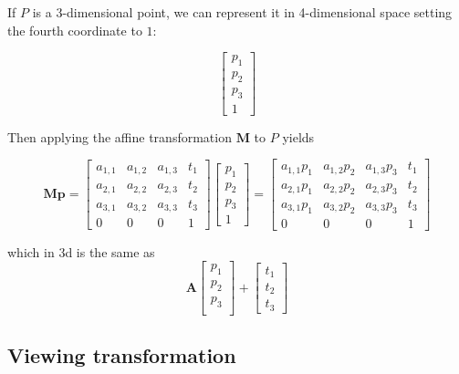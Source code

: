 \documentclass{scrartcl}
\begin{document}
    If $P$ is a 3-dimensional point, we can represent it in 4-dimensional space setting the fourth coordinate to $1$:
    
    \[
    \begin{bmatrix}
        p_1\\
        p_2\\
        p_3 \\
        1
    \end{bmatrix}
    \]
    
    Then applying the affine transformation $\mathbf{M}$ to $P$ yields
    
    \[
    \mathbf{M}\mathbf{p} =
    \begin{bmatrix}
        a_{1,1} & a_{1,2} & a_{1,3} & t_1 \\
        a_{2,1} & a_{2,2} & a_{2,3} & t_2 \\
        a_{3,1} & a_{3,2} & a_{3,3} & t_3 \\
        0 & 0 & 0 & 1 
    \end{bmatrix}
    \begin{bmatrix}
        p_1\\
        p_2\\
        p_3\\
        1
    \end{bmatrix} =
    \begin{bmatrix}
        a_{1,1}p_1 & a_{1,2}p_2 & a_{1,3}p_3 & t_1 \\
        a_{2,1}p_1 & a_{2,2}p_2 & a_{2,3}p_3 & t_2 \\
        a_{3,1}p_1 & a_{3,2}p_2 & a_{3,3}p_3 & t_3 \\
        0 & 0 & 0 & 1 
    \end{bmatrix}
    \]
    
    which in 3d is the same as
    \[
    \mathbf{A}
    \begin{bmatrix}
        p_1\\
        p_2\\
        p_3 \\
    \end{bmatrix} +
    \begin{bmatrix}
        t_1\\
        t_2\\
        t_3 
    \end{bmatrix}
    \]
    
    
      
    \subsection{Viewing transformation}
        
\end{document}
